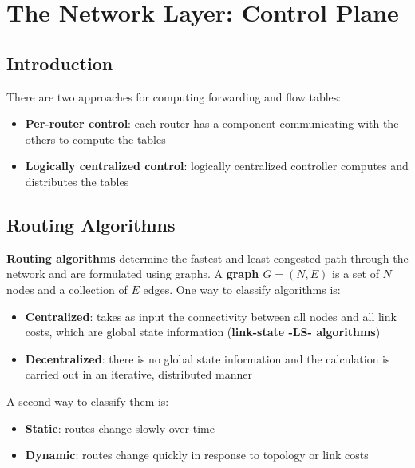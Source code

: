 \documentclass{article}
\begin{document}
\section{The Network Layer: Control Plane}
\subsection{Introduction}
There are two approaches for computing forwarding and flow tables:
\begin{itemize}
    \item \textbf{Per-router control}: each router has a component communicating with the others to compute the tables
    \item \textbf{Logically centralized control}: logically centralized controller computes and distributes the tables
\end{itemize}

\subsection{Routing Algorithms}
\textbf{Routing algorithms} determine the fastest and least congested path through the network and are formulated using graphs. A \textbf{graph $ G = (N, E)$} is a set of $ N $ nodes and a collection of $ E $ edges.
One way to classify algorithms is:
\begin{itemize}
    \item \textbf{Centralized}: takes as input the connectivity between all nodes and all link costs, which are global state information (\textbf{link-state -LS- algorithms})
    \item \textbf{Decentralized}: there is no global state information and the calculation is carried out in an iterative, distributed manner
\end{itemize}
A second way to classify them is:
\begin{itemize}
    \item \textbf{Static}: routes change slowly over time
    \item \textbf{Dynamic}: routes change quickly in response to topology or link costs
\end{itemize}
\end{document}

